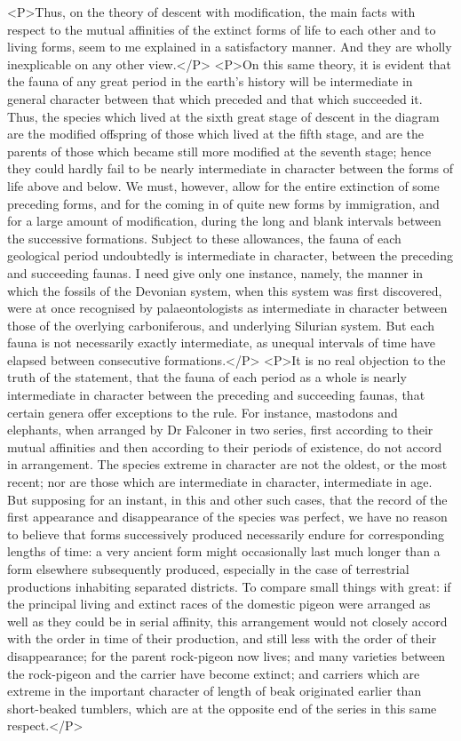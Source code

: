 <P>Thus, on the theory of descent with modification, the main facts with respect to the mutual affinities of the extinct forms of life to each other and to living forms, seem to me explained in a satisfactory manner. And they are wholly inexplicable on any other view.</P>
<P>On this same theory, it is evident that the fauna of any great period in the earth's history will be intermediate in general character between that which preceded and that which succeeded it.  Thus, the species which lived at the sixth great stage of descent in the diagram are the modified offspring of those which lived at the fifth stage, and are the parents of those which became still more modified at the seventh stage; hence they could hardly fail to be nearly intermediate in character between the forms of life above and below. We must, however, allow for the entire extinction of some preceding forms, and for the coming in of quite new forms by immigration, and for a large amount of modification, during the long and blank intervals between the successive formations. Subject to these allowances, the fauna of each geological period undoubtedly is intermediate in character, between the preceding and succeeding faunas. I need give only one instance, namely, the manner in which the fossils of the Devonian system, when this system was first discovered, were at once recognised by palaeontologists as intermediate in character between those of the overlying carboniferous, and underlying Silurian system. But each fauna is not necessarily exactly intermediate, as unequal intervals of time have elapsed between consecutive formations.</P>
<P>It is no real objection to the truth of the statement, that the fauna of each period as a whole is nearly intermediate in character between the preceding and succeeding faunas, that certain genera offer exceptions to the rule. For instance, mastodons and elephants, when arranged by Dr Falconer in two series, first according to their mutual affinities and then according to their periods of existence, do not accord in arrangement. The species extreme in character are not the oldest, or the most recent; nor are those which are intermediate in character, intermediate in age. But supposing for an instant, in this and other such cases, that the record of the first appearance and disappearance of the species was perfect, we have no reason to believe that forms successively produced necessarily endure for corresponding lengths of time: a very ancient form might occasionally last much longer than a form elsewhere subsequently produced, especially in the case of terrestrial productions inhabiting separated districts. To compare small things with great: if the principal living and extinct races of the domestic pigeon were arranged as well as they could be in serial affinity, this arrangement would not closely accord with the order in time of their production, and still less with the order of their disappearance; for the parent rock-pigeon now lives; and many varieties between the rock-pigeon and the carrier have become extinct; and carriers which are extreme in the important character of length of beak originated earlier than short-beaked tumblers, which are at the opposite end of the series in this same respect.</P>
